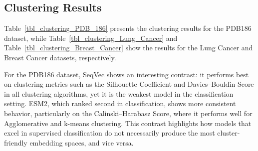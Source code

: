 \documentclass[]{Liebert_Author_revised}
\begin{document}



\subsection{Clustering Results}
Table~\ref{tbl_clustering_PDB_186} presents the clustering results for the PDB186 dataset, while Table~\ref{tbl_clustering_Lung_Cancer} and Table~\ref{tbl_clustering_Breast_Cancer} show the results for the Lung Cancer and Breast Cancer datasets, respectively.

For the PDB186 dataset, SeqVec shows an interesting contrast: it performs best on clustering metrics such as the Silhouette Coefficient and Davies–Bouldin Score in all clustering algorithms, yet it is the weakest model in the classification setting. ESM2, which ranked second in classification, shows more consistent behavior, particularly on the Calinski–Harabasz Score, where it performs well for Agglomerative and k-means clustering. This contrast highlights how models that excel in supervised classification do not necessarily produce the most cluster-friendly embedding spaces, and vice versa.

\end{document}

